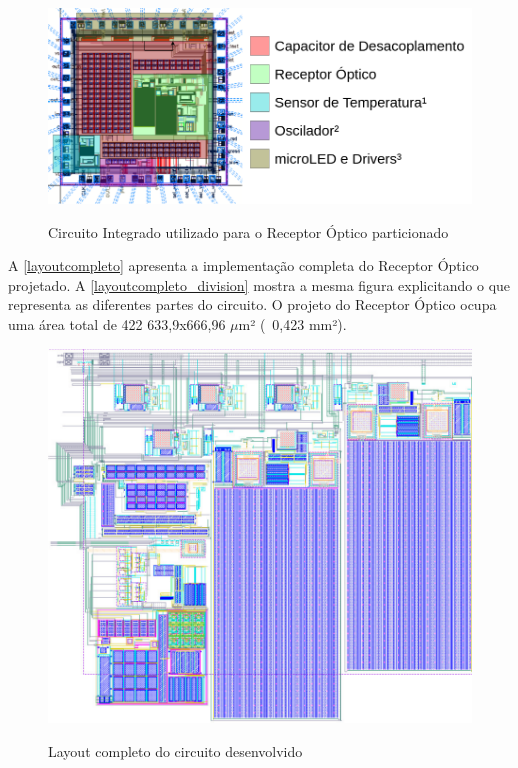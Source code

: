 \begin{figure}[!h]
 \centering
    \caption{Circuito Integrado utilizado para o Receptor Óptico particionado} 
    \includegraphics[scale=0.4]{Resultados/Imagens/Image_CircuitoIntegrado.png}
    \label{fig_circintegrado_division}
\end{figure}

A \autoref{layoutcompleto} apresenta a implementação completa do Receptor Óptico projetado. A \autoref{layoutcompleto_division} mostra a mesma figura explicitando o que representa as diferentes partes do circuito. O projeto do Receptor Óptico ocupa uma área total de 422 633,9x666,96 $\mu$m² (~0,423 mm²).

\begin{figure}[!h]
 \centering
    \caption{Layout completo do circuito desenvolvido} 
    \includegraphics[scale=1, angle = 90]{Resultados/Imagens/Circuito Completo.png}
    \label{layoutcompleto}
\end{figure}

